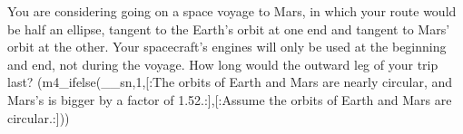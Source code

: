         You are considering going on a space voyage to Mars, in
        which your route would be half an ellipse, tangent to the
        Earth's orbit at one end and tangent to Mars' orbit at the
        other. Your spacecraft's engines will only be used at the
        beginning and end, not during the voyage. How long would the
        outward leg of your trip last? (m4_ifelse(__sn,1,[:The orbits of Earth and Mars are nearly circular, and Mars's is bigger by a factor of 1.52.:],[:Assume the orbits of Earth
        and Mars are circular.:])) \answercheck
